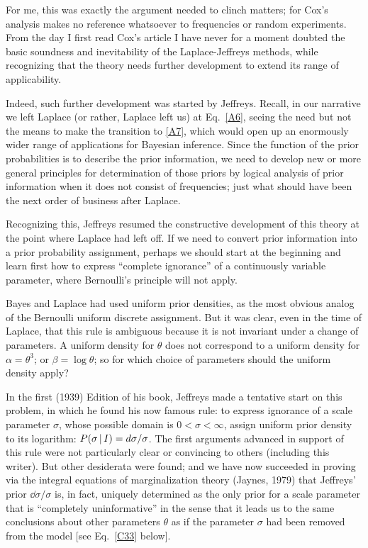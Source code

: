 For me, this was exactly the argument needed to clinch matters; for Cox's analysis makes no reference whatsoever to frequencies or random experiments.
From the day I first read Cox's article I have never for a moment doubted the basic soundness and inevitability of the Laplace-Jeffreys methods, while recognizing that the theory needs further development to extend its range of applicability.

Indeed, such further development was started by Jeffreys.
Recall, in our narrative we left Laplace (or rather, Laplace left us) at Eq.~\eqref{A6}, seeing the need but not the means to make the transition to \eqref{A7}, which would open up an enormously wider range of applications for Bayesian inference.
Since the function of the prior probabilities is to describe the prior information, we need to develop new or more general principles for determination of those priors by logical analysis of prior information when it does not consist of frequencies; just what should have been the next order of business after Laplace.

Recognizing this, Jeffreys resumed the constructive development of this theory at the point where Laplace had left off.
If we need to convert prior information into a prior probability assignment, perhaps we should start at the beginning and learn first how to express ``complete ignorance'' of a continuously variable parameter, where Bernoulli's principle will not apply.

Bayes and Laplace had used uniform prior densities, as the most obvious analog of the Bernoulli uniform discrete assignment.
But it was clear, even in the time of Laplace, that this rule is ambiguous because it is not invariant under a change of parameters.
A uniform density for $\theta$ does not correspond to a uniform density for $\alpha=\theta^3$; or $\beta = \log \theta$; so for which choice of parameters should the uniform density apply?

In the first (1939) Edition of his book, Jeffreys made a tentative start on this problem, in which he found his now famous rule: to express ignorance of a scale parameter $\sigma$, whose possible domain is $0<\sigma <\infty$, assign uniform prior density to its logarithm: $P(\sigma \,\vert\, I) = \mathop{}\!d \sigma/\sigma$.
The first arguments advanced in support of this rule were not particularly clear or convincing to others (including this writer).
But other desiderata were found; and we have now succeeded in proving via the integral equations of marginalization theory (Jaynes, \cite{jaynes79}{1979}) that Jeffreys’ prior $\dd \sigma/\sigma$ is, in fact, uniquely determined as the only prior for a scale parameter that is ``completely uninformative'' in the sense that it leads us to the same conclusions about other parameters $\theta$ as if the parameter $\sigma$ had been removed from the model [see Eq.~\eqref{C33} below].

